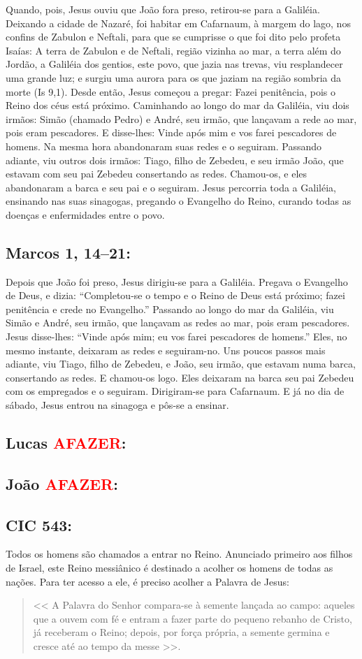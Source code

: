 \documentclass[10pt,a5paper]{book}
\newcommand{\from}[1]{\subsection*{#1}}
\newcommand{\TODO}{\textcolor{red}{\ttfamily AFAZER}}
\begin{document}
Quando, pois, Jesus ouviu que João fora preso, retirou-se para a Galiléia.
Deixando a cidade de Nazaré, foi habitar em Cafarnaum, à margem do lago, nos confins de Zabulon e Neftali,
para que se cumprisse o que foi dito pelo profeta Isaías:
A terra de Zabulon e de Neftali, região vizinha ao mar, a terra além do Jordão, a Galiléia dos gentios,
este povo, que jazia nas trevas, viu resplandecer uma grande luz;
e surgiu uma aurora para os que jaziam na região sombria da morte (Is 9,1).
Desde então, Jesus começou a pregar:
Fazei penitência, pois o Reino dos céus está próximo.
Caminhando ao longo do mar da Galiléia, viu dois irmãos:
Simão (chamado Pedro) e André, seu irmão, que lançavam a rede ao mar, pois eram pescadores.
E disse-lhes:
Vinde após mim e vos farei pescadores de homens.
Na mesma hora abandonaram suas redes e o seguiram.
Passando adiante, viu outros dois irmãos:
Tiago, filho de Zebedeu, e seu irmão João, que estavam com seu pai Zebedeu consertando as redes.
Chamou-os, e eles abandonaram a barca e seu pai e o seguiram.
Jesus percorria toda a Galiléia, ensinando nas suas sinagogas, pregando o Evangelho do Reino, curando todas as doenças e enfermidades entre o povo.

\from{Marcos 1, 14--21:}

Depois que João foi preso, Jesus dirigiu-se para a Galiléia.
Pregava o Evangelho de Deus, e dizia:
``Completou-se o tempo e o Reino de Deus está próximo;
fazei penitência e crede no Evangelho.''
Passando ao longo do mar da Galiléia, viu Simão e André, seu irmão, que lançavam as redes ao mar, pois eram pescadores.
Jesus disse-lhes:
``Vinde após mim;
eu vos farei pescadores de homens.''
Eles, no mesmo instante, deixaram as redes e seguiram-no.
Uns poucos passos mais adiante, viu Tiago, filho de Zebedeu, e João, seu irmão, que estavam numa barca, consertando as redes.
E chamou-os logo.
Eles deixaram na barca seu pai Zebedeu com os empregados e o seguiram.
Dirigiram-se para Cafarnaum.
E já no dia de sábado, Jesus entrou na sinagoga e pôs-se a ensinar.

\from{Lucas \TODO:}

\from{João \TODO:}

\from{CIC 543:}

Todos os homens são chamados a entrar no Reino.
Anunciado primeiro aos filhos de Israel, este Reino messiânico é destinado a acolher os homens de todas as nações.
Para ter acesso a ele, é preciso acolher a Palavra de Jesus:
\begin{quote}
<< A Palavra do Senhor compara-se à semente lançada ao campo:
aqueles que a ouvem com fé e entram a fazer parte do pequeno rebanho de Cristo, já receberam o Reino;
depois, por força própria, a semente germina e cresce até ao tempo da messe >>.
\end{quote}
\end{document}
